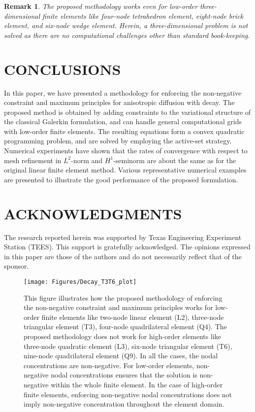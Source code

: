 \documentclass[11pt]{amsart}
\newtheorem{remark}[theorem]{Remark}
\begin{document}
\begin{remark}
  The proposed methodology works even for low-order three-dimensional finite 
  elements like four-node tetrahedron element, eight-node brick element, and 
  six-node wedge element. Herein, a three-dimensional problem is not solved 
  as there are no computational challenges other than standard book-keeping.
\end{remark} 
\section{CONCLUSIONS}
\label{Sec:Decay_Conclusions}
In this paper, we have presented a methodology for enforcing the 
non-negative constraint and maximum principles for anisotropic 
diffusion with decay. The proposed method is obtained by adding 
constraints to the variational structure of the classical Galerkin 
formulation, and can handle general computational grids with low-order 
finite elements. The resulting equations form a convex quadratic 
programming problem, and are solved by employing the active-set 
strategy. Numerical experiments have shown that the rates of 
convergence with respect to mesh refinement in $L^{2}$-norm 
and $H^{1}$-seminorm are about the same as for the original 
linear finite element method. Various representative numerical 
examples are presented to illustrate the good performance of 
the proposed formulation.  


\section*{ACKNOWLEDGMENTS}
The research reported herein was supported by Texas Engineering Experiment Station 
(TEES). This support is gratefully acknowledged. The opinions expressed in this paper 
are those of the authors and do not necessarily reflect that of the sponsor. 




\clearpage 
\newpage

\begin{figure}[h]
  \centering	
  \texttt{[image: Figures/Decay\_T3T6\_plot]}
  \caption{This figure illustrates how the proposed methodology of 
    enforcing the non-negative constraint and maximum principles 
    works for low-order finite elements like two-node linear element 
    (L2), three-node triangular element (T3), four-node quadrilateral 
    element (Q4). The proposed methodology does not  work for high-order 
    elements like three-node quadratic element (L3), six-node triangular 
    element (T6), nine-node quadrilateral element (Q9). In all the cases, 
    the nodal concentrations are non-negative. For low-order elements, 
    non-negative nodal concentrations ensures that the solution is 
    non-negative within the whole finite element. In the case of 
    high-order finite elements, enforcing non-negative nodal 
    concentrations does not imply non-negative concentration 
    throughout the element domain.} \label{Fig:Decay_T3T6_plot}
\end{figure}
\end{document}
